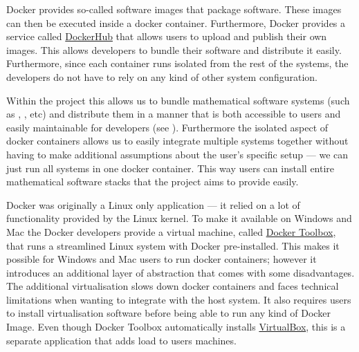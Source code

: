 \documentclass{deliverablereport}
\begin{document}
Docker provides so-called software images that package software. These
images can then be executed inside a docker container. Furthermore,
Docker provides a service called
\href{https://hub.docker.com/}{DockerHub} that allows users to upload
and publish their own images. This allows developers to bundle their
software and distribute it easily. Furthermore, since each container
runs isolated from the rest of the systems, the developers do not have
to rely on any kind of other system configuration.

Within the \ODK project this allows us to bundle mathematical software
systems (such as \GAP, \Sage, etc) and distribute them in a manner
that is both accessible to users and easily maintainable for
developers (see ). Furthermore the isolated aspect of docker containers
allows us to easily integrate multiple systems together without having
to make additional assumptions about the user's specific setup --- we
can just run all systems in one docker container. This way users can
install entire mathematical software stacks that the \ODK project
aims to provide easily.

Docker was originally a Linux only application --- it relied on a lot
of functionality provided by the Linux kernel. To make it available on
Windows and Mac the Docker developers provide a virtual machine, called
\href{https://www.docker.com/products/docker-toolbox}{Docker Toolbox},
that runs a streamlined Linux system with Docker pre-installed. This
makes it possible for Windows and Mac users to run docker containers;
however it introduces an additional layer of abstraction that comes
with some disadvantages. The additional virtualisation slows down
docker containers and faces technical limitations when wanting to
integrate with the host system. It also requires users to install
virtualisation software before being able to run any kind of Docker
Image. Even though Docker Toolbox automatically installs
\href{https://www.virtualbox.org/}{VirtualBox}, this is a separate
application that adds load to users machines.
\end{document}
